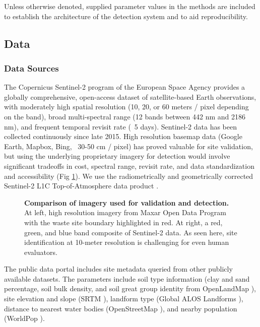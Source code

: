 \documentclass[10pt,letterpaper]{article}
\begin{document}
Unless otherwise denoted, supplied parameter values in the methods are included to establish the architecture of the detection system and to aid reproducibility.

\subsection*{Data}\label{methods:data}
\subsubsection*{Data Sources}
The Copernicus Sentinel-2 program of the European Space Agency provides a globally comprehensive, open-access dataset of satellite-based Earth observations, with moderately high spatial resolution (10, 20, or 60 meters / pixel depending on the band), broad multi-spectral range (12 bands between 442 nm and 2186 nm), and frequent temporal revisit rate (~5 days). Sentinel-2 data has been collected continuously since late 2015. High resolution basemap data (Google Earth, Mapbox, Bing, ~30-50 cm / pixel) has proved valuable for site validation, but using the underlying proprietary imagery for detection would involve significant tradeoffs in cost, spectral range, revisit rate, and data standardization and accessibility (Fig \ref{fig:sentinel_data}). We use the radiometrically and geometrically corrected Sentinel-2 L1C Top-of-Atmosphere data product \cite{sentinel2user}.

\begin{figure}[!h]
    \caption{{\bf Comparison of imagery used for validation and detection.}
    At left, high resolution imagery from Maxar Open Data Program \cite{maxar} with the waste site boundary highlighted in red. At right, a red, green, and blue band composite of Sentinel-2 data. As seen here, site identification at 10-meter resolution is challenging for even human evaluators.}
    \label{fig:sentinel_data}
\end{figure}

The public data portal includes site metadata queried from other publicly available datasets. The parameters include soil type information (clay and sand percentage, soil bulk density, and soil great group identity from OpenLandMap \cite{hengl_tomislav_2019_3274342}), site elevation and slope (SRTM \cite{farr2007shuttle}), landform type (Global ALOS Landforms \cite{theobald2015ecologically}), distance to nearest water bodies (OpenStreetMap \cite{haklay2008openstreetmap}), and nearby population (WorldPop \cite{tatem2017worldpop}).
\end{document}
